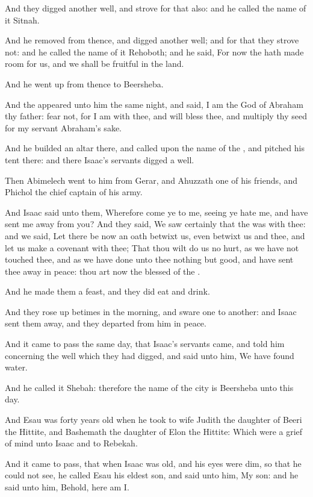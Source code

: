 \Verse And they digged another well, and strove for that also: and he called the name of it Sitnah.

\Verse And he removed from thence, and digged another well; and for that they strove not: and he called the name of it Rehoboth; and he said, For now the \LORD hath made room for us, and we shall be fruitful in the land.

\Verse And he went up from thence to Beersheba.

\Verse And the \LORD appeared unto him the same night, and said, I am the God of Abraham thy father: fear not, for I am with thee, and will bless thee, and multiply thy seed for my servant Abraham's sake.

\Verse And he builded an altar there, and called upon the name of the \LORD, and pitched his tent there: and there Isaac's servants digged a well.

\Verse Then Abimelech went to him from Gerar, and Ahuzzath one of his friends, and Phichol the chief captain of his army.

\Verse And Isaac said unto them, Wherefore come ye to me, seeing ye hate me, and have sent me away from you?  \Verse And they said, We saw certainly that the \LORD was with thee: and we said, Let there be now an oath betwixt us, even betwixt us and thee, and let us make a covenant with thee; \Verse That thou wilt do us no hurt, as we have not touched thee, and as we have done unto thee nothing but good, and have sent thee away in peace: thou art now the blessed of the \LORD.

\Verse And he made them a feast, and they did eat and drink.

\Verse And they rose up betimes in the morning, and sware one to another: and Isaac sent them away, and they departed from him in peace.

\Verse And it came to pass the same day, that Isaac's servants came, and told him concerning the well which they had digged, and said unto him, We have found water.

\Verse And he called it Shebah: therefore the name of the city is Beersheba unto this day.

\Verse And Esau was forty years old when he took to wife Judith the daughter of Beeri the Hittite, and Bashemath the daughter of Elon the Hittite: \Verse Which were a grief of mind unto Isaac and to Rebekah.

\Chapter
\Verse And it came to pass, that when Isaac was old, and his eyes were dim, so that he could not see, he called Esau his eldest son, and said unto him, My son: and he said unto him, Behold, here am I.

